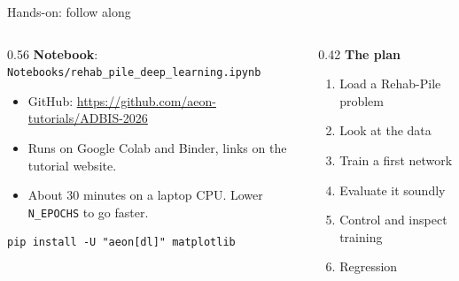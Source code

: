 \documentclass[aspectratio=169,10pt]{beamer}
\begin{document}
\begin{frame}[fragile]{Hands-on: follow along}
  \begin{columns}[c]
    \begin{column}{0.56\textwidth}
      \textbf{Notebook}: \texttt{Notebooks/rehab\_pile\_deep\_learning.ipynb}
      \begin{itemize}
        \item GitHub: \url{https://github.com/aeon-tutorials/ADBIS-2026}
        \item Runs on Google Colab and Binder, links on the tutorial website.
        \item About 30 minutes on a laptop CPU. Lower \texttt{N\_EPOCHS} to go faster.
      \end{itemize}
\begin{lstlisting}
pip install -U "aeon[dl]" matplotlib
\end{lstlisting}
    \end{column}
    \begin{column}{0.42\textwidth}
      \textbf{The plan}
      \begin{enumerate}
        \item Load a Rehab-Pile problem
        \item Look at the data
        \item Train a first network
        \item Evaluate it soundly
        \item Control and inspect training
        \item Regression
      \end{enumerate}
    \end{column}
  \end{columns}
\end{frame}
\end{document}
